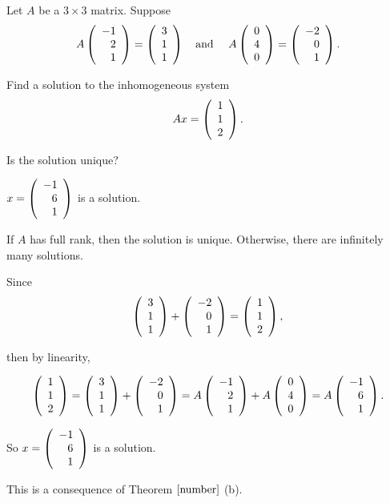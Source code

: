 \documentclass{ximera}
\begin{document}
\begin{exercise} \label{YZ_3.4.3}
Let $A$ be a $3\times 3$ matrix.  Suppose 
\[
A\Matrix{-1\\2\\1}=\Matrix{3\\1\\1} \textup{\quad and \quad} A\Matrix{0\\4\\0}=\Matrix{-2\\0\\1}.
\]

\begin{enumeratea}
\item Find a solution to the inhomogeneous system 
\[
Ax=\Matrix{1 \\ 1 \\2}.
\]
\item Is the solution unique?
\end{enumeratea}


\begin{solution}
\ans 

\begin{enumeratea}
\item $x=\Matrix{-1 \\ 6 \\ 1}$ is a solution. 

\item If $A$ has full rank, then the solution is unique. Otherwise, there are infinitely many solutions.
\end{enumeratea}




\soln 
\begin{enumeratea}
\item  Since
\[
\Matrix{3 \\ 1\\ 1}+ \Matrix{-2 \\ 0 \\ 1}=\Matrix{1 \\ 1 \\ 2},
\]

then by linearity, 

\[
\Matrix{1 \\ 1\\ 2}=\Matrix{3 \\ 1\\ 1}+ \Matrix{-2 \\ 0 \\ 1}=A\Matrix{-1 \\ 2\\ 1}+A\Matrix{0 \\ 4 \\ 0}=A\Matrix{-1 \\ 6 \\ 1}.
\] 

So $x=\Matrix{-1 \\ 6 \\ 1}$ is a solution.

\item This is a consequence of Theorem $\ref{number}$ (b).
\end{enumeratea}

\end{solution}
\end{exercise}
\end{document}
